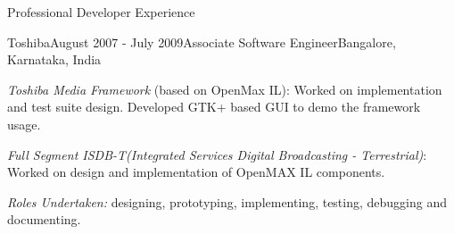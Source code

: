 \begin{rSection}{Professional Developer Experience}
\begin{rSubsection}{Toshiba}{August 2007 - July 2009}{Associate Software Engineer}{Bangalore, Karnataka, India}
\setlength{\itemindent}{.1in}
\item
	\emph{Toshiba Media Framework} (based on OpenMax IL): Worked on implementation and test suite design. Developed GTK+ based GUI to demo the framework usage.
\item
	\emph{Full Segment ISDB-T(Integrated Services Digital Broadcasting - Terrestrial)}: Worked on design and implementation of OpenMAX IL components.

\emph{Roles Undertaken:} designing, prototyping, implementing, testing, debugging and documenting.
\end{rSubsection}


\end{rSection}







